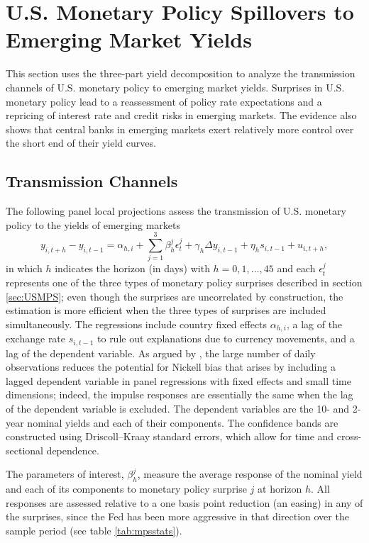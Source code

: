 \documentclass[a4paper, 12pt]{article}
\providecommand{\idxt}{t}
\providecommand{\idxi}{i}
\providecommand{\idxh}{h}
\providecommand{\idxspnlfwd}{\idxi,{\idxt+\idxh}}
\providecommand{\idxspnllag}{\idxi,{\idxt-1}}
\providecommand{\yld}{y}
\providecommand{\fx}{\mathit{s}}
\newcommand{\eqpanelLP}{\yld_{\idxspnlfwd} - \yld_{\idxspnllag} = \alpha_{\idxh,\idxi} + \sum^{3}_{j = 1} \beta^{j}_{\idxh} \epsilon^{j}_{\idxt} + \gamma_{\idxh} \Delta \yld_{\idxspnllag} + \eta_{\idxh} \fx_{\idxspnllag}  + u_{\idxspnlfwd}}
\begin{document}
\section{U.S. Monetary Policy Spillovers to Emerging Market Yields} \label{sec:analysis}
This section uses the three-part yield decomposition to analyze the transmission channels of U.S. monetary policy to emerging market yields. Surprises in U.S. monetary policy lead to a reassessment of policy rate expectations and a repricing of interest rate and credit risks in emerging markets. The evidence also shows that central banks in emerging markets exert relatively more control over the short end of their yield curves. 

\subsection{Transmission Channels} \label{sec:LPs} 
The following panel local projections assess the transmission of U.S. monetary policy to the yields of emerging markets 
\begin{equation} \label{eq:nPanelLP}
\eqpanelLP,
\end{equation}
in which \(\idxh\) indicates the horizon (in days) with \(\idxh = 0, 1, \ldots, 45\) and each \(\epsilon^{j}_{\idxt}\) represents one of the three types of monetary policy surprises described in section \ref{sec:USMPS}; even though the surprises are uncorrelated by construction, the estimation is more efficient when the three types of surprises are included simultaneously. The regressions include country fixed effects \(\alpha_{\idxh,\idxi}\), a lag of the exchange rate \(\fx_{\idxspnllag}\) to rule out explanations due to currency movements, and a lag of the dependent variable. As argued by \cite{HofmannShimShin:2020}, the large number of daily observations reduces the potential for Nickell bias that arises by including a lagged dependent variable in panel regressions with fixed effects and small time dimensions; indeed, the impulse responses are essentially the same when the lag of the dependent variable is excluded. The dependent variables are the 10- and 2-year nominal yields and each of their components. The confidence bands are constructed using Driscoll--Kraay standard errors, which allow for time and cross-sectional dependence. %

The parameters of interest, \(\beta^{j}_{\idxh}\), measure the average response of the nominal yield and each of its components to monetary policy surprise \(j\) at horizon \(\idxh\). All responses are assessed relative to a one basis point reduction (an easing) in any of the surprises, since the Fed has been more aggressive in that direction over the sample period (see table \ref{tab:mpsstats}). 
\end{document}
